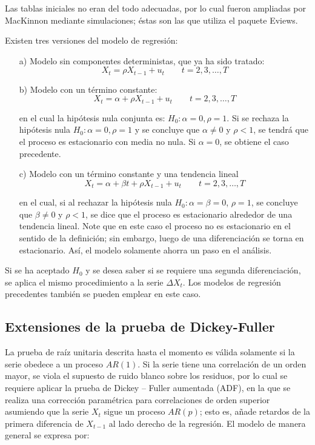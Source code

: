 Las tablas iniciales no eran del todo adecuadas, por lo cual fueron ampliadas por MacKinnon mediante simulaciones; \'{e}stas son las que utiliza el paquete Eviews.\newline

Existen tres versiones del modelo de regresi\'{o}n:
\begin{enumerate}
 \item[a)] Modelo sin componentes deterministas, que ya ha sido tratado:
\[
X_{t}=\rho X_{t-1}+u_{t}   \qquad   t=2,3,\ldots ,T
\]
\item[b)] Modelo con un t\'{e}rmino constante:
\[
X_{t}=\alpha +\rho X_{t-1}+u_{t} \qquad t=2,3,\ldots,T
\]

en el cual la hip\'{o}tesis nula conjunta es: $H_{0}:\alpha =0,  \rho =1.$ Si se rechaza la hip\'{o}tesis nula $H_{0}:\alpha =0,  \rho =1$ y se concluye que $\alpha \ne 0$ y $\rho <1$, se tendr\'{a} que el proceso es estacionario con media no nula. Si $\alpha =0$, se obtiene el caso precedente.

\item[c)] Modelo con un t\'{e}rmino constante y una tendencia lineal
\[
X_{t}=\alpha +\beta t+\rho X_{t-1}+u_{t} \qquad t=2,3,\ldots,T
\]

en el cual, si al rechazar la hip\'{o}tesis nula $H_{0}:\alpha =\beta =0$,  $\rho =1$, se concluye que $\beta \ne 0$ y $\rho <1$, se dice que el proceso es estacionario alrededor de una tendencia lineal. Note que en este caso el proceso no es estacionario en el sentido de la definici\'{o}n; sin embargo, luego de una diferenciaci\'{o}n se torna en estacionario. As\'{i}, el modelo solamente ahorra un paso en el an\'{a}lisis.
\end{enumerate}

Si se ha aceptado $H_{0}$ y se desea saber si se requiere una segunda diferenciaci\'{o}n, se aplica el mismo procedimiento a la serie $\Delta X_{t}$. Los modelos de regresi\'{o}n precedentes tambi\'{e}n se pueden emplear en este caso.

\subsection{Extensiones de la prueba de Dickey-Fuller}

La prueba de ra\'{i}z unitaria descrita hasta el momento es v\'{a}lida solamente si la serie obedece a un proceso $AR(1)$. Si la serie tiene una correlaci\'{o}n de un orden mayor, se viola el supuesto de ruido blanco sobre los residuos, por lo cual se requiere aplicar la prueba de Dickey -- Fuller aumentada (ADF), en la que se realiza una correcci\'{o}n param\'{e}trica para correlaciones de orden superior asumiendo que la serie $X_{t}$ sigue un proceso $AR(p)$; esto es, a\~{n}ade retardos de la primera diferencia de $X_{t-1}$ al lado derecho de la regresi\'{o}n. El modelo de manera general se expresa por:

